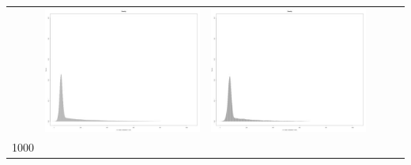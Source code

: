 \begin{table}[htbp]
{\begin{tabular}{l | ccccc}
    			   & \begin{minipage}{.15\textwidth}\vspace{2pt}     							
     			 	\includegraphics[width=\linewidth]{images/mema-dens-graph/N7}
    				 \end{minipage}
    			   &	 \begin{minipage}{.15\textwidth}\vspace{2pt}     							
     			 	\includegraphics[width=\linewidth]{images/mema-dens-graph/N10}
    				 \end{minipage}\\	
		1000   &	 \begin{minipage}{.15\textwidth}\vspace{2pt}     							

\end{minipage}
\end{tabular}}
\end{table}
